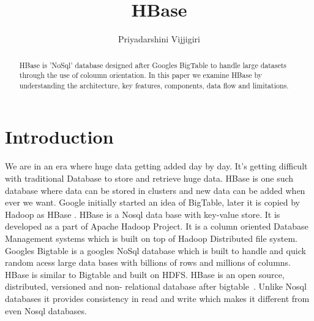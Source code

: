 
\title{HBase}


\author{Priyadarshini Vijjigiri}


\renewcommand{\shortauthors}{P. Vijjigiri}


\begin{abstract}

HBase is 'NoSql' database designed after Googles BigTable to handle large
datasets through the use of coloumn orientation. In this paper we examine HBase
by  understanding the architecture, key features, components, data flow and
limitations.

\end{abstract}


\maketitle

\section{Introduction}

We are in an era where huge data getting added day by day. It's getting
difficult with traditional Database to store and retrieve huge data. HBase is
one such database where data can be stored in clusters and new data can be added
when ever we want. Google initially started an idea of BigTable, later it is
copied by Hadoop as HBase . HBase is a Nosql data base with key-value store. It
is developed as a part of Apache Hadoop Project. It is a column oriented
Database Management systems which is built on top of Hadoop Distributed file
system. Googles Bigtable is a googles NoSql database which is built to handle
and quick random acess large data bases with billions of rows and millions of
columns. HBase is similar to Bigtable and built on HDFS. HBase is an open
source, distributed, versioned  and non- relational database after
bigtable~\cite {hid-sp18-421-HBase-intro}. Unlike Nosql databases it provides
consistency in read and write which makes it different from even Nosql
databases.

